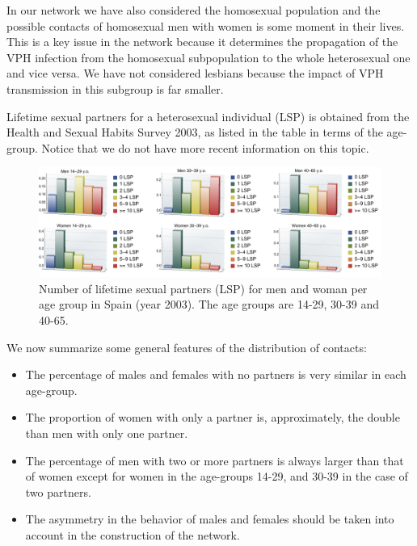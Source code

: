 In our network we have also considered the homosexual population and the possible contacts of homosexual men with women is some moment in their lives. This is a key issue in the network because it determines the propagation of the VPH infection from the homosexual subpopulation to the whole heterosexual one and vice versa. We have not considered lesbians because the impact of VPH transmission in this subgroup is far smaller.

Lifetime sexual partners for a heterosexual individual (LSP) is obtained from the Health and Sexual Habits Survey 2003, as listed in the table in terms of the age-group. Notice that we do not have more recent information on this topic.

\begin{figure}[ht]
	\centering
	\includegraphics[scale=0.7]{lsp.pdf}
	\caption{Number of lifetime sexual partners (LSP) for men and woman per age group in Spain (year 2003). The age groups are 14-29, 30-39 and 40-65.}
	\label{lsp}
\end{figure}

We now summarize some general features of the distribution of contacts: 

\begin{itemize}
	\item The percentage of males and females with no partners is very similar in each age-group.

	\item The proportion of women with only a partner is, approximately,
the double than men with only one partner. 

	\item The percentage of men with two or more partners is always larger than that of women except for women in the age-groups 14-29, and 30-39 in the case of two partners.

	\item The asymmetry in the behavior of males and females should be taken into account in the construction of the network.
\end{itemize}

